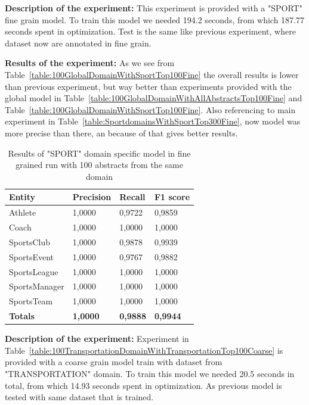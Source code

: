 \documentclass[thesis=M,english]{FITthesis}[2018/05/30]
\begin{document}
	\textbf{Description of the experiment:} This experiment is provided with a "SPORT" fine grain model. To train this model we needed 194.2 seconds, from which 187.77 seconds spent in optimization. Test is the same like previous experiment, where dataset now are annotated in fine grain.

	\textbf{Results of the experiment:} As we see from Table~\ref{table:100GlobalDomainWithSportTop100Fine} the overall results is lower than previous experiment, but way better than experiments provided with the global model in Table~\ref{table:100GlobalDomainWithAllAbstractsTop100Fine} and Table~\ref{table:100GlobalDomainWithSportTop100Fine}. Also referencing to main experiment in Table~\ref{table:SportdomainsWithSportTop300Fine}, now model was more precise than there, an because of that gives better results.

	\begin{table}[H]\centering
		\begin{tabular}{|l|l|l|l|}
			\hline {\textbf{Entity}} & {\textbf{Precision}} & {\textbf{Recall}} & {\textbf{F1 score}}\\\hline
				Athlete & 1,0000 & 0,9722 & 0,9859\\
				Coach & 1,0000 & 1,0000 & 1,0000\\
				SportsClub & 1,0000 & 0,9878 & 0,9939\\
				SportsEvent & 1,0000 & 0,9767 & 0,9882\\
				SportsLeague & 1,0000 & 1,0000 & 1,0000\\
				SportsManager & 1,0000 & 1,0000 & 1,0000\\				
				SportsTeam & 1,0000 & 1,0000 & 1,0000\\\hline
				\textbf{Totals} & \textbf{1,0000} & \textbf{0,9888} & \textbf{0,9944}\\\hline
		\end{tabular}
		\caption{Results of "SPORT" domain specific model in fine grained run with 100 abstracts from the same domain \label{table:100SportDomainWithSportTop100Fine}}
	\end{table}	

	\textbf{Description of the experiment:} Experiment in Table~\ref{table:100TransportationDomainWithTransportationTop100Coarse} is provided with a coarse grain model train with dataset from "TRANSPORTATION" domain. To train this model we needed 20.5 seconds in total, from which 14.93 seconds spent in optimization. As previous model is tested with same dataset that is trained.
\end{document}
